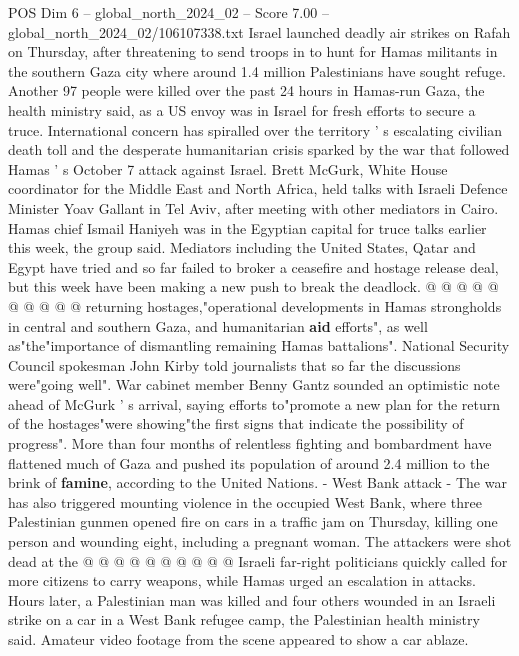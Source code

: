 \begin{textsample}{POS Dim 6 – global\_north\_2024\_02 – Score 7.00 – global\_north\_2024\_02/106107338.txt}  \label{ex:f6_pos_196}
Israel launched deadly air strikes on Rafah on Thursday, after threatening to send troops in to hunt for Hamas militants in the southern Gaza city where around 1.4 million Palestinians have sought refuge.
Another 97 people were killed over the past 24 hours in Hamas-run Gaza, the health ministry said, as a US envoy was in Israel for fresh efforts to secure a truce.
International concern has spiralled over the territory ' s escalating civilian death toll and the desperate humanitarian crisis sparked by the war that followed Hamas ' s October 7 attack against Israel.
Brett McGurk, White House coordinator for the Middle East and North Africa, held talks with Israeli Defence Minister Yoav Gallant in Tel Aviv, after meeting with other mediators in Cairo.
Hamas chief Ismail Haniyeh was in the Egyptian capital for truce talks earlier this week, the group said.
Mediators including the United States, Qatar and Egypt have tried and so far failed to broker a ceasefire and hostage release deal, but this week have been making a new push to break the deadlock. @ @ @ @ @ @ @ @ @ @ returning hostages,"operational developments in Hamas strongholds in central and southern Gaza, and humanitarian \textbf{aid} efforts", as well as"the"importance of dismantling remaining Hamas battalions".
National Security Council spokesman John Kirby told journalists that so far the discussions were"going well".
War cabinet member Benny Gantz sounded an optimistic note ahead of McGurk ' s arrival, saying efforts to"promote a new plan for the return of the hostages"were showing"the first signs that indicate the possibility of progress".
More than four months of relentless fighting and bombardment have flattened much of Gaza and pushed its population of around 2.4 million to the brink of \textbf{famine}, according to the United Nations. - West Bank attack - The war has also triggered mounting violence in the occupied West Bank, where three Palestinian gunmen opened fire on cars in a traffic jam on Thursday, killing one person and wounding eight, including a pregnant woman.
The attackers were shot dead at the @ @ @ @ @ @ @ @ @ @ Israeli far-right politicians quickly called for more citizens to carry weapons, while Hamas urged an escalation in attacks.
Hours later, a Palestinian man was killed and four others wounded in an Israeli strike on a car in a West Bank refugee camp, the Palestinian health ministry said.
Amateur video footage from the scene appeared to show a car ablaze.

\end{textsample}
